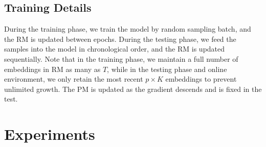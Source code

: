 \documentclass[sigconf]{acmart}
\begin{document}
\subsection{Training Details}
During the training phase, we train the model by random sampling batch, and the RM is updated between epochs. During the testing phase, we feed the samples into the model in chronological order, and the RM is updated sequentially. Note that in the training phase, we maintain a full number of embeddings in RM as many as $T$, while in the testing phase and online environment, we only retain the most recent $p\times K$ embeddings to prevent unlimited growth. The PM is updated as the gradient descends and is fixed in the test.

\section{Experiments}

\begin{table}[h]
    \centering
	\caption{Summary of Experimental Datasets}
	\label{tab:data}
\end{table}
\end{document}
